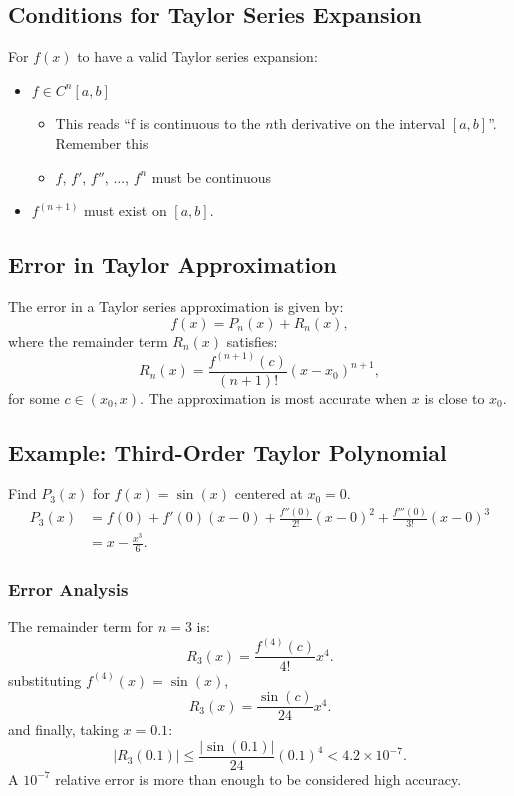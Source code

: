 \subsection{Conditions for Taylor Series Expansion}

For $f(x)$ to have a valid Taylor series expansion:
\begin{itemize}
  \item $f \in C^n[a, b]$
    \begin{itemize}
      \item This reads \enquote{f is continuous to the $n$th derivative on the
        interval $[a, b]$}.
        \tiny *Remember this\normalsize
      \item \ie $f$, $f'$, $f''$, ..., $f^n$ must be continuous
    \end{itemize}
  \item $f^{(n+1)}$ must exist on $[a, b]$.
\end{itemize}

\subsection{Error in Taylor Approximation}

The error in a Taylor series approximation is given by:
\begin{equation*}
    f(x) = P_n(x) + R_n(x),
\end{equation*}
where the remainder term $R_n(x)$ satisfies:
\begin{equation*}
    R_n(x) = \frac{f^{(n+1)}(c)}{(n+1)!} (x - x_0)^{n+1},
\end{equation*}
for some $c \in (x_0, x)$. The approximation is most accurate when $x$ is 
close to $x_0$.

\subsection{Example: Third-Order Taylor Polynomial}

Find $P_3(x)$ for $f(x) = \sin(x)$ centered at $x_0 = 0$.
\begin{align*}
    P_3(x) &= f(0) + f'(0)(x - 0) + \frac{f''(0)}{2!} (x - 0)^2 + 
             \frac{f'''(0)}{3!} (x - 0)^3 \\
           &= x - \frac{x^3}{6}.
\end{align*}

\subsubsection{Error Analysis}
The remainder term for $n = 3$ is:
\begin{equation*}
    R_3(x) = \frac{f^{(4)}(c)}{4!} x^4.
\end{equation*}
substituting $f^{(4)}(x) = \sin(x)$,
\begin{equation*}
    R_3(x) = \frac{\sin(c)}{24} x^4.
\end{equation*}
and finally, taking $x = 0.1$:
\begin{equation*}
    |R_3(0.1)| \leq \frac{|\sin(0.1)|}{24} (0.1)^4 < 4.2 \times 10^{-7}.
\end{equation*}
A $10^{-7}$ relative error is more than enough to be considered high accuracy.

